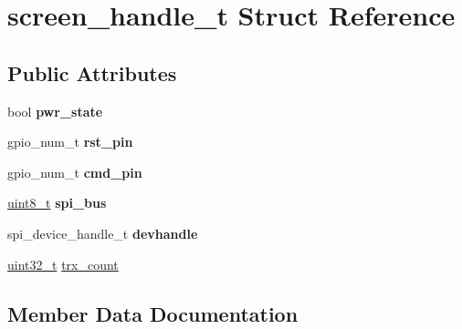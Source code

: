 \hypertarget{structscreen__handle__t}{}\section{screen\+\_\+handle\+\_\+t Struct Reference}
\label{structscreen__handle__t}
\subsection*{Public Attributes}
\begin{DoxyCompactItemize}
\item 
\mbox{\label{structscreen__handle__t_ad5fa1b9c65723fe90fbaa5a96326d7ae}} 
bool {\bfseries pwr\+\_\+state}
\item 
\mbox{\label{structscreen__handle__t_ac729f85f804e11fdaf9e6acec568deff}} 
gpio\+\_\+num\+\_\+t {\bfseries rst\+\_\+pin}
\item 
\mbox{\label{structscreen__handle__t_a4e3c5e6113a0b8eba70031cb99046bc3}} 
gpio\+\_\+num\+\_\+t {\bfseries cmd\+\_\+pin}
\item 
\mbox{\label{structscreen__handle__t_a4791b6cdd636fd0990a9d83b8d840e06}} 
\hyperlink{vl53l0x__types_8h_aba7bc1797add20fe3efdf37ced1182c5}{uint8\+\_\+t} {\bfseries spi\+\_\+bus}
\item 
\mbox{\label{structscreen__handle__t_ac4f48c2fd6bd5cff5cebc91ed0201d92}} 
spi\+\_\+device\+\_\+handle\+\_\+t {\bfseries devhandle}
\item 
\hyperlink{vl53l0x__types_8h_a435d1572bf3f880d55459d9805097f62}{uint32\+\_\+t} \hyperlink{structscreen__handle__t_a5d83bc20f6e600a8e9133b90af8034d5}{trx\+\_\+count}
\end{DoxyCompactItemize}


\subsection{Member Data Documentation}
\mbox{\label{structscreen__handle__t_a5d83bc20f6e600a8e9133b90af8034d5}} 
